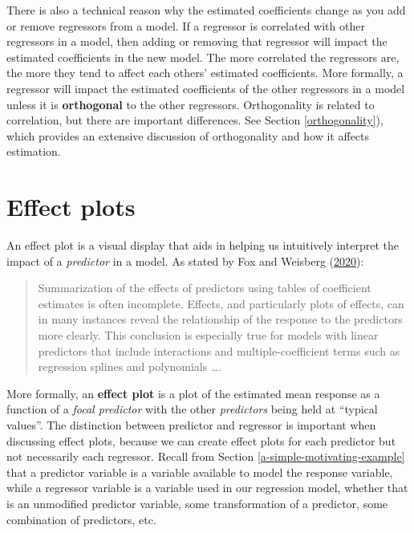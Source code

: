 \documentclass[
]{book}
\theoremstyle{definition}
\theoremstyle{definition}
\theoremstyle{definition}
\theoremstyle{definition}
\theoremstyle{remark}
\begin{document}
There is also a technical reason why the estimated coefficients change
as you add or remove regressors from a model. If a regressor is
correlated with other regressors in a model, then adding or removing
that regressor will impact the estimated coefficients in the new model.
The more correlated the regressors are, the more they tend to affect
each others' estimated coefficients. More formally, a regressor will
impact the estimated coefficients of the other regressors in a model
unless it is \textbf{orthogonal} to the other regressors. Orthogonality is
related to correlation, but there are important differences. See Section
\ref{orthogonality}), which provides an extensive discussion of
orthogonality and how it affects estimation.

\hypertarget{effect-plots}{%
\section{Effect plots}\label{effect-plots}}

An effect plot is a visual display that aids in helping us intuitively
interpret the impact of a \emph{predictor} in a model. As stated by
Fox and Weisberg (\protect\hyperlink{ref-fox2020predictor}{2020}):

\begin{quote}
Summarization of the effects of predictors using tables of coefficient
estimates is often incomplete. Effects, and particularly plots of
effects, can in many instances reveal the relationship of the response
to the predictors more clearly. This conclusion is especially true for
models with linear predictors that include interactions and
multiple-coefficient terms such as regression splines and polynomials
\ldots.
\end{quote}

More formally, an \textbf{effect plot} is a plot of the estimated mean
response as a function of a \emph{focal predictor} with the other
\emph{predictors} being held at ``typical values''. The distinction between
predictor and regressor is important when discussing effect plots,
because we can create effect plots for each predictor but not
necessarily each regressor. Recall from Section
\ref{a-simple-motivating-example} that a predictor variable is a
variable available to model the response variable, while a regressor
variable is a variable used in our regression model, whether that is an
unmodified predictor variable, some transformation of a predictor, some
combination of predictors, etc.
\end{document}

